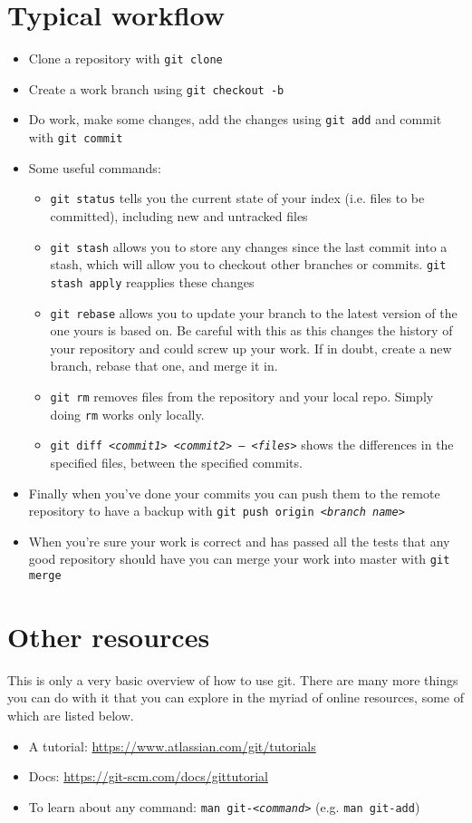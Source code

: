 \documentclass{article}
\newcommand{\code}[1]{\texttt{#1}}
\newcommand{\ital}[1]{\textit{#1}}
\begin{document}
\section{Typical workflow}
\begin{itemize}
  \item Clone a repository with \code{git clone}
  \item Create a work branch using \code{git checkout -b}
  \item Do work, make some changes, add the changes using \code{git add} and commit with \code{git commit}
  \item Some useful commands: 
  \begin{itemize}
   \item \code{git status} tells you the current state of your index (i.e. files to be committed), including new and untracked files
   \item \code{git stash} allows you to store any changes since the last commit into a stash, which will allow you to checkout other branches or commits. \code{git stash apply} reapplies these changes
   \item \code{git rebase} allows you to update your branch to the latest version of the one yours is based on. Be careful with this as this changes the history of your repository and could screw up your work. If in doubt, create a new branch, rebase that one, and merge it in. 
   \item \code{git rm} removes files from the repository and your local repo. Simply doing \code{rm} works only locally. 
   \item \code{git diff <\ital{commit1}> <\ital{commit2}> -- <\ital{files}>} shows the differences in the specified files, between the specified commits. 
  \end{itemize}
  \item Finally when you've done your commits you can push them to the remote repository to have a backup with \code{git push origin <\ital{branch name}>}
  \item When you're sure your work is correct and has passed all the tests that any good repository should have you can merge your work into master with \code{git merge}

\end{itemize}

\section{Other resources}
This is only a very basic overview of how to use git. There are many more things you can do with it that you can explore in the myriad of online resources, some of which are listed below.
\begin{itemize}
  \item A tutorial: \url{https://www.atlassian.com/git/tutorials}
  \item Docs: \url{https://git-scm.com/docs/gittutorial}
  \item To learn about any command: \code{man git-<\ital{command}>} (e.g. \code{man git-add})
\end{itemize}
\end{document}
